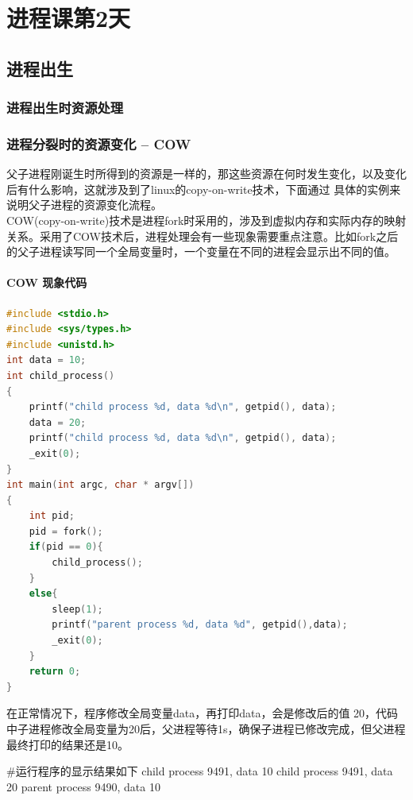 


\part{进程课第2天}

\chapter{进程出生}
\section{进程出生时资源处理}



\section{进程分裂时的资源变化 -- COW}
父子进程刚诞生时所得到的资源是一样的，那这些资源在何时发生变化，以及变化后有什么影响，这就涉及到了linux的copy-on-write技术，下面通过 具体的实例来说明父子进程的资源变化流程。\\
COW(copy-on-write)技术是进程fork时采用的，涉及到虚拟内存和实际内存的映射关系。采用了COW技术后，进程处理会有一些现象需要重点注意。比如fork之后的父子进程读写同一个全局变量时，一个变量在不同的进程会显示出不同的值。
\subsection{COW 现象代码}
\begin{lstlisting}[language={C}]
#include <stdio.h>
#include <sys/types.h>
#include <unistd.h>
int data = 10;
int child_process()
{
    printf("child process %d, data %d\n", getpid(), data);
    data = 20;
    printf("child process %d, data %d\n", getpid(), data);
    _exit(0);
}
int main(int argc, char * argv[])
{
    int pid;
    pid = fork();
    if(pid == 0){
        child_process();
    }
    else{
        sleep(1);
        printf("parent process %d, data %d", getpid(),data);
        _exit(0);
    }
    return 0;
}
\end{lstlisting}
在正常情况下，程序修改全局变量data，再打印data，会是修改后的值 20，代码中子进程修改全局变量为20后，父进程等待1s，确保子进程已修改完成，但父进程最终打印的结果还是10。
\begin{latexcmd}[label= COW现象]
#运行程序的显示结果如下
child process 9491, data 10
child process 9491, data 20
parent process 9490, data 10
\end{latexcmd}

